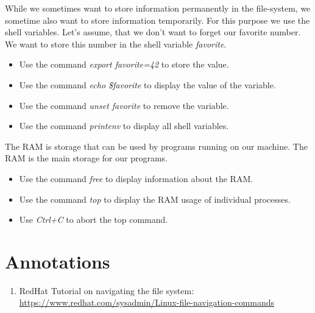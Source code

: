 \documentclass{dcbl/challenge}
\begin{document}
\begin{aufgabe}
    While we sometimes want to store information permanently in the file-system, we sometime also want to store information temporarily.
    For this purpose we use the shell variables.
    Let's assume, that we don't want to forget our favorite number.
    We want to store this number in the shell variable \textit{favorite}.
    \begin{itemize}
        \item Use the command \textit{export favorite=42} to store the value.
        \item Use the command \textit{echo \$favorite} to display the value of the variable.
        \item Use the command \textit{unset favorite} to remove the variable.
        \item Use the command \textit{printenv} to display all shell variables.
    \end{itemize}

\end{aufgabe}
\begin{aufgabe}
    The RAM is storage that can be used by programs running on our machine. 
    The RAM is the main storage for our programs.
    \begin{itemize}
        \item Use the command \textit{free} to display information about the RAM.
        \item Use the command \textit{top} to display the RAM usage of individual processes.
        \item Use \textit{Ctrl+C} to abort the top command.
    \end{itemize}

\end{aufgabe}

\section*{Annotations}
\begin{enumerate}
    \item RedHat Tutorial on navigating the file system:\\ \url{https://www.redhat.com/sysadmin/Linux-file-navigation-commands}
\end{enumerate}
\end{document}
